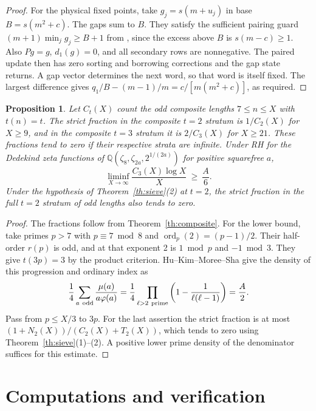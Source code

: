 \documentclass[11pt,reqno]{amsart}
\newtheorem{proposition}[theorem]{Proposition}
\newcommand{\Q}{\mathbb Q}
\newcommand{\ord}{\operatorname{ord}}
\begin{document}
\begin{proof}
For the physical fixed points, take \(g_j=s(m+u_j)\) in base \(B=s(m^2+c)\). The gaps sum to \(B\). They satisfy the sufficient pairing guard \((m+1)\min_jg_j\ge B+1\) from \cite[Section~2]{G10}, since the excess above \(B\) is \(s(m-c)\ge1\). Also \(Pg=g\), \(d_1(g)=0\), and all secondary rows are nonnegative. The paired update \cite[Lemma~4]{G10} then has zero sorting and borrowing corrections and the gap state returns. A gap vector determines the next word, so that word is itself fixed. The largest difference gives \(q_1/B-(m-1)/m=c/[m(m^2+c)]\), as required.
\end{proof}

\begin{proposition}\label{prop:composite-count}
Let \(C_t(X)\) count the odd composite lengths \(7\le n\le X\) with \(t(n)=t\). The strict fraction in the composite \(t=2\) stratum is \(1/C_2(X)\) for \(X\ge9\), and in the composite \(t=3\) stratum it is \(2/C_3(X)\) for \(X\ge21\). These fractions tend to zero if their respective strata are infinite. Under RH for the Dedekind zeta functions of
\(\Q(\zeta_8,\zeta_{2a},2^{1/(2a)})\) for positive squarefree \(a\),
\[
 \liminf_{X\to\infty}\frac{C_3(X)\log X}{X}\ \ge\ \frac{A}{6}.
\]
Under the hypothesis of Theorem~\ref{th:sieve}(2) at \(t=2\), the strict fraction in the full \(t=2\) stratum of odd lengths also tends to zero.
\end{proposition}
\begin{proof}
The fractions follow from Theorem~\ref{th:composite}. For the lower bound, take primes \(p>7\) with \(p\equiv7\bmod8\) and \(\ord_p(2)=(p-1)/2\). Their half-order \(r(p)\) is odd, and at that exponent 2 is \(1\bmod p\) and \(-1\bmod3\). They give \(t(3p)=3\) by the product criterion. Hu--Kim--Moree--Sha \cite[Theorem~3.1 and \S4.3, Case III]{HKMS} give the density of this progression and ordinary index as
\[
 \frac14\sum_{a\ {\rm odd}}\frac{\mu(a)}{a\varphi(a)}
 =\frac14\prod_{\ell>2\ {\rm prime}}\left(1-\frac1{\ell(\ell-1)}\right)=\frac A2.
\]
Pass from \(p\le X/3\) to \(3p\). For the last assertion the strict fraction is at most \((1+N_2(X))/(C_2(X)+T_2(X))\), which tends to zero using Theorem~\ref{th:sieve}(1)--(2). A positive lower prime density of the denominator suffices for this estimate.
\end{proof}

\section{Computations and verification}\label{sec:verification}
\end{document}
